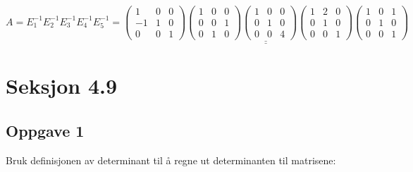 \documentclass{article}
\newcommand{\vect}[1]{\begin{pmatrix} #1 \end{pmatrix}}
\newcommand{\uu}[1]{\underline{\underline{#1}}}
\begin{document}
\\\\\\\\\)
\[A = E_1^{-1}E_2^{-1}E_3^{-1}E_4^{-1}E_5^{-1} = \uu{
\vect{1&0&0\\-1&1&0\\0&0&1} \vect{1&0&0\\0&0&1\\0&1&0} \vect{1&0&0\\0&1&0\\0&0&4} \vect{1&2&0\\0&1&0\\0&0&1} \vect{1&0&1\\0&1&0\\0&0&1}
}
\]

\newpage
\section*{Seksjon 4.9}
\subsection*{Oppgave 1}
Bruk definisjonen av determinant til å regne ut determinanten til matrisene:
\end{document}
